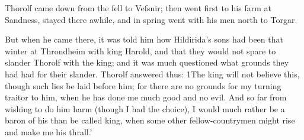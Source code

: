Thorolf came down from the fell to Vefsnir; then went first to his farm at Sandness, stayed there awhile, and in spring went with his men north to Torgar.

But when he came there, it was told him how Hildirida's sons had been that winter at Throndheim with king Harold, and that they would not spare to slander Thorolf with the king; and it was much questioned what grounds they had had for their slander. Thorolf answered thus: 1The king will not believe this, though such lies be laid before him; for there are no grounds for my turning traitor to him, when he has done me much good and no evil. And so far from wishing to do him harm (though I had the choice), I would much rather be a baron of his than be called king, when some other fellow-countrymen might rise and make me his thrall.'
